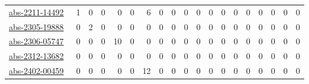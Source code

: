 {\begin{longtable}{l*{18}{r}}
\href{articles/abs-2211-14492.pdf}{abs-2211-14492}~\cite{abs-2211-14492} & 1 & 0 & 0 & 0 & 0 & 6 & 0 & 0 & 0 & 0 & 0 & 0 & 0 & 0 & 0 & 0 & 0 & 0\\
\href{articles/abs-2305-19888.pdf}{abs-2305-19888}~\cite{abs-2305-19888} & 0 & 2 & 0 & 0 & 0 & 0 & 0 & 0 & 0 & 0 & 0 & 0 & 0 & 0 & 0 & 0 & 0 & 0\\
\href{articles/abs-2306-05747.pdf}{abs-2306-05747}~\cite{abs-2306-05747} & 0 & 0 & 0 & 10 & 0 & 0 & 0 & 0 & 0 & 0 & 0 & 0 & 0 & 0 & 0 & 0 & 0 & 0\\
\href{articles/abs-2312-13682.pdf}{abs-2312-13682}~\cite{abs-2312-13682} & 0 & 0 & 0 & 0 & 0 & 0 & 0 & 0 & 0 & 0 & 0 & 0 & 0 & 0 & 0 & 0 & 0 & 0\\
\href{articles/abs-2402-00459.pdf}{abs-2402-00459}~\cite{abs-2402-00459} & 0 & 0 & 0 & 0 & 0 & 12 & 0 & 0 & 0 & 0 & 0 & 0 & 0 & 0 & 0 & 0 & 0 & 0\\
\end{longtable}
}

